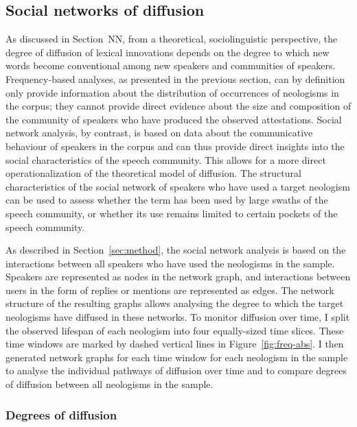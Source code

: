 \documentclass[
  a4paper,
  abstract=on,
  captions=tableabove
  ]{scrartcl}
\begin{document}
  \subsection{Social networks of diffusion}
    \label{subsec:sna}

    As discussed in Section~NN, from a theoretical, sociolinguistic perspective, the degree of diffusion of lexical innovations depends on the degree to which new words become conventional among new speakers and communities of speakers. Frequency-based analyses, as presented in the previous section, can by definition only provide information about the distribution of occurrences of neologisms in the corpus; they cannot provide direct evidence about the size and composition of the community of speakers who have produced the observed attestations. Social network analysis, by contrast, is based on data about the communicative behaviour of speakers in the corpus and can thus provide direct insights into the social characteristics of the speech community. This allows for a more direct operationalization of the theoretical model of diffusion. The structural characteristics of the social network of speakers who have used a target neologism can be used to assess whether the term has been used by large swaths of the speech community, or whether its use remains limited to certain pockets of the speech community.

    As described in Section~\ref{sec:method}, the social network analysis is based on the interactions between all speakers who have used the neologisms in the sample. Speakers are represented as nodes in the network graph, and interactions between users in the form of replies or mentions are represented as edges. The network structure of the resulting graphs allows analysing the degree to which the target neologisms have diffused in these networks. To monitor diffusion over time, I split the observed lifespan of each neologism into four equally-sized time slices. These time windows are marked by dashed vertical lines in Figure~\ref{fig:freq-abs}. I then generated network graphs for each time window for each neologism in the sample to analyse the individual pathways of diffusion over time and to compare degrees of diffusion between all neologisms in the sample.

    \subsubsection{Degrees of diffusion}
      \label{subsec:degrees-of-diffusion}
\end{document}
